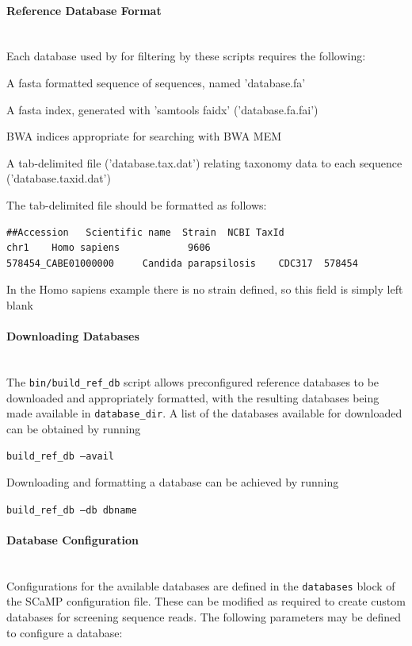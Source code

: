 \documentclass[a4paper,10pt]{article}
\newenvironment{tight_enumerate}{
\begin{enumerate}
  \setlength{\itemsep}{0pt}
  \setlength{\parskip}{0pt}
}{\end{enumerate}}
\newcommand{\para}[1]{\paragraph{#1}\mbox{}\\}
\begin{document}
\para{Reference Database Format}

Each database used by for filtering by these scripts requires the following:

\begin{tight_enumerate}
\item A fasta formatted sequence of sequences, named 'database.fa'
\item A fasta index, generated with 'samtools faidx' ('database.fa.fai')
\item BWA indices appropriate for searching with BWA MEM 
\item A tab-delimited file ('database.tax.dat') relating taxonomy data to each sequence ('database.taxid.dat')
\end{tight_enumerate}

The tab-delimited file should be formatted as follows:

\begin{verbatim}
##Accession   Scientific name  Strain  NCBI TaxId
chr1    Homo sapiens            9606
578454_CABE01000000     Candida parapsilosis    CDC317  578454
\end{verbatim}

In the Homo sapiens example there is no strain defined, so this field is simply left blank

\para{Downloading Databases}

The {\tt bin/build\_ref\_db} script allows preconfigured reference databases to
be downloaded and appropriately formatted, with the resulting databases being
made available in {\tt database\_dir}. A list of the databases available for
downloaded can be obtained by running

{\tt build\_ref\_db --avail}

Downloading and formatting a database can be achieved by running

{\tt build\_ref\_db --db dbname}

\para{Database Configuration}

Configurations for the available databases are defined in the {\tt databases}
block of the SCaMP configuration file. These can be modified as required to
create custom databases for screening sequence reads. The following parameters
may be defined to configure a database:
\end{document}
